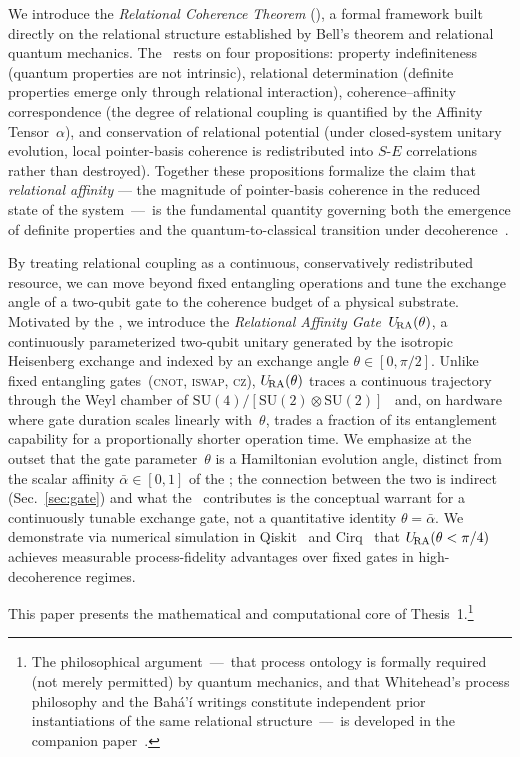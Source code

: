 We introduce the \emph{Relational Coherence Theorem} (\RCT), a formal framework
built directly on the relational structure established by Bell's theorem and
relational quantum mechanics.
The \RCT~rests on four propositions: property indefiniteness (quantum properties
are not intrinsic), relational determination (definite properties emerge only
through relational interaction), coherence--affinity correspondence (the degree
of relational coupling is quantified by the Affinity Tensor~$\alpha$), and
conservation of relational potential (under closed-system unitary evolution,
local pointer-basis coherence is redistributed into $S$-$E$ correlations rather
than destroyed).
Together these propositions formalize the claim that \emph{relational affinity}
--- the magnitude of pointer-basis coherence in the reduced state of the
system~---~is the fundamental quantity governing both the emergence of
definite properties and the quantum-to-classical transition under
decoherence~\cite{Zurek2003}.

By treating relational coupling as a continuous, conservatively redistributed
resource, we can move beyond fixed entangling operations and tune the
exchange angle of a two-qubit gate to the coherence budget of a physical
substrate.
Motivated by the \RCT, we introduce the \emph{Relational Affinity
Gate}~$U_{\!\mathrm{RA}}(\theta)$, a continuously parameterized two-qubit unitary
generated by the isotropic Heisenberg exchange and indexed by an
exchange angle $\theta \in [0,\pi/2]$.
Unlike fixed entangling gates~(\textsc{cnot}, \textsc{iswap}, \textsc{cz}),
$U_{\!\mathrm{RA}}(\theta)$ traces a continuous trajectory through the Weyl chamber
of $\mathrm{SU}(4)/[\mathrm{SU}(2)\otimes\mathrm{SU}(2)]$~\cite{Zhang2003WeylChamber}
and, on hardware where gate duration scales linearly with~$\theta$,
trades a fraction of its entanglement capability for a proportionally
shorter operation time.
We emphasize at the outset that the gate parameter~$\theta$ is a
Hamiltonian evolution angle, distinct from the scalar affinity
$\bar\alpha \in [0,1]$ of the \RCT; the connection between the two is
indirect (Sec.~\ref{sec:gate}) and what the \RCT~contributes is the
conceptual warrant for a continuously tunable exchange gate, not a
quantitative identity $\theta = \bar\alpha$.
We demonstrate via numerical simulation in Qiskit~\cite{Qiskit2024} and
Cirq~\cite{Cirq2025} that $U_{\!\mathrm{RA}}(\theta < \pi/4)$ achieves measurable
process-fidelity advantages over fixed gates in high-decoherence regimes.

This paper presents the mathematical and computational core of
Thesis~1.\footnote{The philosophical argument~---~that process ontology
is formally required (not merely permitted) by quantum mechanics, and
that Whitehead's process philosophy and the Bah\'{a}'\'{i} writings
constitute independent prior instantiations of the same relational
structure~---~is developed in the companion
paper~\cite{Adams2026Philosophy}.}

